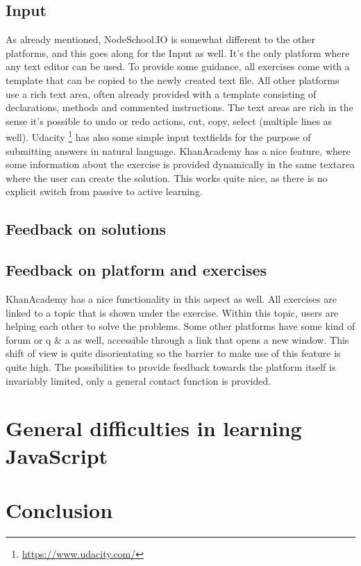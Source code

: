 \documentclass{article}
\begin{document}
\subsection{Input}
As already mentioned, NodeSchool.IO is somewhat different to the other
platforms, and this goes along for the Input as well. It's the only platform
where any
text editor can be used. To provide some guidance, all exercises come with a 
template that can be copied to the newly created text file. All other platforms
use a rich text area, often already provided with a template consisting of 
declarations, methods and commented instructions. The text areas are rich in the
sense it's possible to undo or redo actions, cut, copy, select (multiple lines 
as well). Udacity
\footnote{\url{https://www.udacity.com/}} has also some simple input textfields
for the purpose of submitting answers in natural language. KhanAcademy has a
nice feature, where some information about the exercise is provided dynamically
in the same textarea where the user can create the solution. This works quite
nice, as there is no explicit switch from passive to active learning.

\subsection{Feedback on solutions}

\subsection{Feedback on platform and exercises}
KhanAcademy has a nice functionality in this aspect as well. All exercises are 
linked to a topic that is shown under the exercise. Within this topic, users are 
helping each other to solve the problems. Some other platforms have some kind
of forum or q \& a as well, accessible through a link that opens a new window. 
This shift of view is quite disorientating so the barrier to make use 
of this feature is quite high. The possibilities to provide feedback towards the 
platform itself is invariably limited, only a general contact function is 
provided. 

\section{General difficulties in learning JavaScript} 

\section{Conclusion} 
\end{document}
